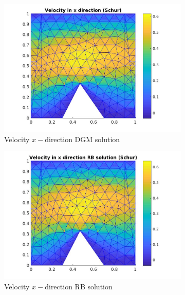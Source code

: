 \documentclass[graybox]{svmult}
\begin{document}
\begin{figure}[H] %
\begin{subfigure}{0.31\textwidth}
\includegraphics[width=\linewidth]{offline_velocity_1_at_47_33.jpg}
\caption{Velocity $x-$direction DGM solution} \label{vel_x_dg}
\end{subfigure}\hspace*{\fill}
\begin{subfigure}{0.31\textwidth}
\includegraphics[width=\linewidth]{online_velocity_1_at_47_33.jpg}
\caption{Velocity $x-$direction RB solution} \label{vel_x_rb}
\end{subfigure}
\begin{subfigure}{0.31\textwidth}

\end{subfigure}
\end{figure}
\end{document}
